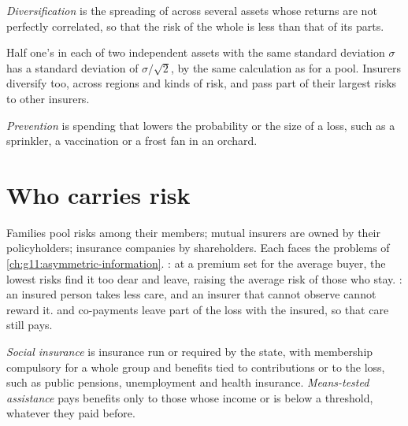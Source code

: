 \begin{definition}[Diversification]\label{def:g12:risk-and-insurance:diversification}
\emph{Diversification} is the spreading of  across several assets whose returns are not perfectly correlated, so that the risk of the whole is
less than that of its parts.
\end{definition}

Half one's  in each of two independent assets with the same standard deviation $\sigma$ has a standard deviation of $\sigma/\sqrt{2}$, by the same calculation as for
a pool. Insurers diversify too, across regions and kinds of risk, and pass part of their largest risks to other insurers.

\begin{definition}[Prevention]\label{def:g12:risk-and-insurance:prevention}
\emph{Prevention} is spending that lowers the probability or the size of a loss, such as a sprinkler, a vaccination or a frost fan in an orchard.
\end{definition}

\section{Who carries risk}\label{sec:g12:risk-and-insurance:who}

Families pool risks among their members; mutual insurers are owned by their policyholders; insurance companies by shareholders. Each faces the problems of
\cref{ch:g11:asymmetric-information}. : at a premium set for the average buyer, the lowest risks find it too dear and leave, raising the average risk of
those who stay. : an insured person takes less care, and an insurer that cannot observe  cannot reward it.  and co-payments leave part of
the loss with the insured, so that care still pays.

\begin{definition}\label{def:g12:risk-and-insurance:social-insurance}
\emph{Social insurance} is insurance run or required by the state, with membership compulsory for a whole group and benefits tied to
contributions or to the loss, such as public pensions, unemployment and health insurance. \emph{Means-tested assistance}%
\label{def:g12:risk-and-insurance:assistance} pays benefits only to those whose income or  is below a threshold, whatever they paid before.
\end{definition}

